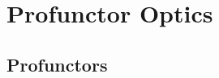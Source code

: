 \documentclass[11pt,a4paper]{article}
\makeatletter
\theoremstyle{plain}
\theoremstyle{definition}
\newcommand{\id}{\mathrm{id}}
\providecommand{\leftsquigarrow}{%
  \mathrel{\mathpalette\reflect@squig\relax}%
}
\newcommand{\reflect@squig}[2]{%
  \reflectbox{$\m@th#1\rightsquigarrow$}%
}
\newcommand{\todo}[1]{\textcolor{red}{\small #1}}
\makeatother
\begin{document}
%
%
%

\section{Profunctor Optics}

\subsection{Profunctors}
\end{document}
